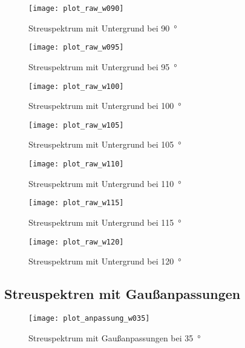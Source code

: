 \documentclass[11pt, ngerman, fleqn, DIV=15, headinclude, BCOR=2cm]{scrreprt}
\begin{document}
\begin{appendix}
\begin{figure}[h]
    \centering
    \texttt{[image: plot\_raw\_w090]}
    \caption{%
	    Streuspektrum mit Untergrund bei \SI{90}{\degree}
    }
    \label{fig:plot_raw_w090}
\end{figure}

\begin{figure}[h]
    \centering
    \texttt{[image: plot\_raw\_w095]}
    \caption{%
	    Streuspektrum mit Untergrund bei \SI{95}{\degree}
    }
    \label{fig:plot_raw_w095}
\end{figure}

\begin{figure}[h]
    \centering
    \texttt{[image: plot\_raw\_w100]}
    \caption{%
	    Streuspektrum mit Untergrund bei \SI{100}{\degree}
    }
    \label{fig:plot_raw_w100}
\end{figure}

\begin{figure}[h]
    \centering
    \texttt{[image: plot\_raw\_w105]}
    \caption{%
	    Streuspektrum mit Untergrund bei \SI{105}{\degree}
    }
    \label{fig:plot_raw_w105}
\end{figure}

\begin{figure}[h]
    \centering
    \texttt{[image: plot\_raw\_w110]}
    \caption{%
	    Streuspektrum mit Untergrund bei \SI{110}{\degree}
    }
    \label{fig:plot_raw_w110}
\end{figure}

\begin{figure}[h]
    \centering
    \texttt{[image: plot\_raw\_w115]}
    \caption{%
	    Streuspektrum mit Untergrund bei \SI{115}{\degree}
    }
    \label{fig:plot_raw_w115}
\end{figure}

\begin{figure}[h]
    \centering
    \texttt{[image: plot\_raw\_w120]}
    \caption{%
	    Streuspektrum mit Untergrund bei \SI{120}{\degree}
    }
    \label{fig:plot_raw_w120}
\end{figure}

\clearpage

\subsection{Streuspektren mit Gaußanpassungen}
\label{anhang-streuspektren-gauss}
\begin{figure}[h]
    \centering
    \texttt{[image: plot\_anpassung\_w035]}
    \caption{%
	    Streuspektrum mit Gaußanpassungen bei \SI{35}{\degree}
    }
    \label{fig:plot_anpassung_w035}
\end{figure}


\end{appendix}
\end{document}
